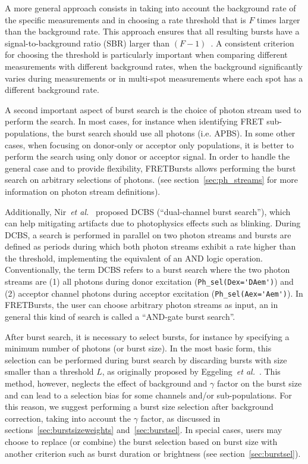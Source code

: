 \documentclass[10pt,letterpaper]{article}
\begin{document}
A more general approach consists in taking into account the background rate of
the specific measurements and in choosing a rate threshold that is $F$ times
larger than the background rate. This approach ensures that all resulting bursts
have a signal-to-background ratio (SBR) larger than
$(F-1)$~\cite{Michalet_2012}. A consistent criterion for choosing the threshold is
particularly important when comparing different measurements with different background
rates, when the background significantly varies during measurements or in
multi-spot measurements where each spot has a different background rate.

A second important aspect of burst search is the choice of photon stream used
to perform the search.
In most cases, for instance when identifying FRET sub-populations,
the burst search should use all photons (i.e. APBS). In some other cases, when focusing on
donor-only or acceptor only populations, it is better to perform the search using
only donor or acceptor signal.
In order to handle the general case and to provide flexibility,
FRETBursts allows performing the burst search on arbitrary selections of photons.
(see section~\ref{sec:ph_streams} for more information on photon stream definitions).

Additionally, Nir~\textit{et al.}~\cite{Nir_2006} proposed DCBS (``dual-channel burst search''), which can help mitigating artifacts due to photophysics effects such as blinking.
During DCBS, a search is performed in parallel on two photon streams
and bursts are defined as periods during which both photon streams exhibit a rate higher than
the threshold, implementing the equivalent of an AND logic operation.
Conventionally, the term DCBS refers to a burst search where the two photon streams
are (1) all photons during donor excitation (\verb|Ph_sel(Dex='DAem')|) and
(2) acceptor channel photons during acceptor excitation (\verb|Ph_sel(Aex='Aem')|).
In FRETBursts, the user can choose arbitrary photon streams as input, an in general
this kind of search is called a ``AND-gate burst search''.

After burst search, it is necessary to select
bursts, for instance by specifying a minimum number of photons (or burst size). In the most
basic form, this selection can be performed during burst search by discarding
bursts with size smaller than a threshold $L$, as originally proposed by
Eggeling~\textit{et al.}~\cite{Eggeling_1998}.
This method, however, neglects the effect
of background and $\gamma$ factor on the burst size and can lead to a selection
bias for some channels and/or sub-populations.
For this reason, we suggest performing a burst size selection after background
correction, taking into account the $\gamma$ factor, as discussed in
sections~\ref{sec:burstsizeweights} and~\ref{sec:burstsel}.
In special cases, users may choose to replace (or combine)
the burst selection based on burst size
with another criterion such as burst duration or brightness (see section~\ref{sec:burstsel}).
\end{document}
